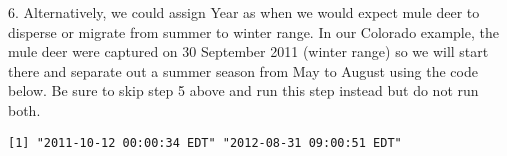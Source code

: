 \documentclass[
  letterpaper,
]{book}
\newenvironment{Shaded}{\begin{snugshade}}{\end{snugshade}}
\newcommand{\AttributeTok}[1]{\textcolor[rgb]{0.40,0.45,0.13}{#1}}
\newcommand{\FunctionTok}[1]{\textcolor[rgb]{0.28,0.35,0.67}{#1}}
\newcommand{\NormalTok}[1]{\textcolor[rgb]{0.00,0.23,0.31}{#1}}
\newcommand{\OtherTok}[1]{\textcolor[rgb]{0.00,0.23,0.31}{#1}}
\newcommand{\SpecialCharTok}[1]{\textcolor[rgb]{0.37,0.37,0.37}{#1}}
\newcommand{\StringTok}[1]{\textcolor[rgb]{0.13,0.47,0.30}{#1}}
\begin{document}
\begin{Shaded}
\end{Shaded}

6. Alternatively, we could assign Year as when we would expect mule deer
to disperse or migrate from summer to winter range. In our Colorado
example, the mule deer were captured on 30 September 2011 (winter range)
so we will start there and separate out a summer season from May to
August using the code below. Be sure to skip step 5 above and run this
step instead but do not run both.

\begin{Shaded}
\end{Shaded}

\begin{verbatim}
[1] "2011-10-12 00:00:34 EDT" "2012-08-31 09:00:51 EDT"
\end{verbatim}
\end{document}
